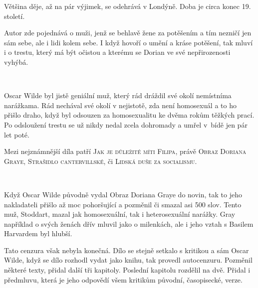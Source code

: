 \documentclass[FGBook.tex]{subfiles}
\begin{document}
\noindent 
Většina děje, až na pár výjimek, se odehrává v Londýně. Doba je circa konec 19. století.

\noindent 
Autor zde pojednává o muži, jenž se behlavě žene za potěšením a tím nezničí jen sám sebe, ale i lidi kolem sebe.
I když hovoří o umění a kráse potěšení, tak mluví i o trestu, který má být očistou a kterému se Dorian ve své nepřirozenosti vyhýbá.

\vspace*{2em}\\





\noindent 
Oscar Wilde byl jistě geniální muž, který rád dráždil své okolí nemístníma narážkama.
Rád nechával své okolí v nejistotě, zda není homosexuál a to ho přišlo draho, když byl odsouzen za homosexualitu ke dvěma rokům těžkých prací.
Po odsloužení trestu se už nikdy nedal zcela dohromady a umřel v~bídě jen pár let poté.


\noindent 
Mezi nejznámnější díla patří \textsc{Jak je důležité míti Filipa}, právě \textsc{Obraz Doriana Graye}, \textsc{Strašidlo cantervillské}, či \textsc{Lidská duše za socialismu}.


\vspace*{2em}\\

\noindent
Když Oscar Wilde původně vydal Obraz Doriana Graye do novin, tak to jeho nakladateli přišlo až moc pohoršující a pozměnil či smazal asi 500 slov.
Tento muž, Stoddart, mazal jak homosexuální, tak i heterosexuální narážky.
Gray například o svých ženách dřív mluvil jako o milenkách, ale i jeho vztah s Basilem Harvardem byl hlubší.

\noindent
Tato cenzura však nebyla konečná.
Dílo se stejně setkalo s kritikou a sám Oscar Wilde, když se dílo rozhodl vydat jako knihu, tak provedl autocenzuru.
Pozměnil některé texty, přidal další tři kapitoly. Poslední kapitolu rozdělil na dvě. Přidal i předmluvu, která je jeho odpovědí všem kritikům původní, časopisecké, verze.
\end{document}
